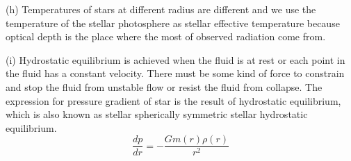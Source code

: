 \documentclass[11pt]{article}
\begin{document}
\begin{CJK}{UTF8}{gbsn}
	(h) Temperatures of stars at different radius are different and we use the temperature of the stellar photosphere as stellar effective temperature because optical depth is the place where the most of observed radiation come from.
	
	(i) Hydrostatic equilibrium is achieved when the fluid is at rest or each point in the fluid has a constant velocity. There must be some kind of force to constrain and stop the fluid from unstable flow or resist the fluid from collapse. The expression for pressure gradient of star is the result of hydrostatic equilibrium, which is also known as stellar  spherically symmetric stellar hydrostatic equilibrium. $$\frac{dp}{dr} = -\frac{Gm(r)\rho(r)}{r^2}$$

\end{CJK}
\end{document}
